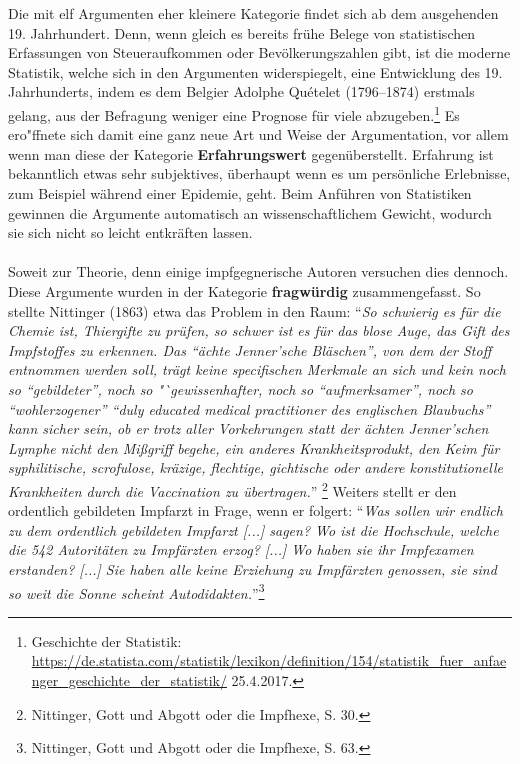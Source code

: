 \documentclass[
    a4paper,
    12pt,
    hyphens,
    chapterprefix=true,
    headheight=33pt,
    footheight=29pt,
    headings=optiontohead, %
]{scrartcl}
\begin{document}
{Die mit elf Argumenten eher kleinere Kategorie findet sich ab dem ausgehenden 19. Jahrhundert. Denn, wenn gleich es bereits frühe Belege von statistischen Erfassungen von Steueraufkommen oder Bevölkerungszahlen gibt, ist die moderne Statistik, welche sich in den Argumenten widerspiegelt, eine Entwicklung des 19. Jahrhunderts, indem es dem Belgier Adolphe Quételet (1796--1874) erstmals gelang, aus der Befragung weniger eine Prognose für viele abzugeben.\footnote{Geschichte der Statistik: \url{https://de.statista.com/statistik/lexikon/definition/154/statistik_fuer_anfaenger_geschichte_der_statistik/} 25.4.2017.} Es ero"ffnete sich damit eine ganz neue Art und Weise der Argumentation, vor allem wenn man diese der Kategorie \textbf{Erfahrungswert} gegenüberstellt. Erfahrung ist bekanntlich etwas sehr subjektives, überhaupt wenn es um persönliche Erlebnisse, zum Beispiel während einer Epidemie, geht. Beim Anführen von Statistiken gewinnen die Argumente automatisch an wissenschaftlichem Gewicht, wodurch sie sich nicht so leicht entkräften lassen. \\
\\
Soweit zur Theorie, denn einige impfgegnerische Autoren versuchen dies dennoch. Diese Argumente wurden in der Kategorie \textbf{fragwürdig} 
zusammengefasst. So stellte Nittinger (1863) etwa das Problem in den Raum: "`\textit{So schwierig es für die Chemie ist, Thiergifte zu prüfen, 
so schwer ist es für das blose Auge, das Gift des Impfstoffes zu erkennen. Das "`ächte Jenner'sche Bläschen"', von dem der Stoff entnommen 
werden soll, trägt keine specifischen Merkmale an sich und kein noch so "`gebildeter"', noch so "`gewissenhafter, noch so "`aufmerksamer"', noch 
so "`wohlerzogener"' "`duly educated medical practitioner des englischen Blaubuchs"' kann sicher sein, ob er trotz aller Vorkehrungen statt der 
ächten Jenner'schen Lymphe nicht den Mißgriff begehe, ein anderes Krankheitsprodukt, den Keim für syphilitische, scrofulose, kräzige, flechtige, 
gichtische oder andere konstitutionelle Krankheiten
durch die Vaccination zu übertragen.}"'
\footnote{Nittinger, Gott und Abgott oder die 
Impfhexe, S. 30.} Weiters stellt er den ordentlich gebildeten Impfarzt in Frage, wenn er folgert: "`\textit{Was sollen wir endlich zu dem 
ordentlich gebildeten Impfarzt [...] sagen? Wo ist die Hochschule, welche die 542 Autoritäten zu Impfärzten erzog? [...] Wo haben sie ihr 
Impfexamen erstanden? [...] Sie haben alle keine Erziehung zu Impfärzten genossen, sie sind so weit die Sonne scheint 
Autodidakten.}"'\footnote{Nittinger, Gott und Abgott oder die Impfhexe, S. 63.} \\
}
\end{document}
